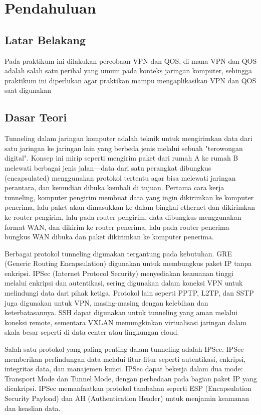 \section{Pendahuluan}
\subsection{Latar Belakang}
Pada praktikum ini dilakukan percobaan VPN dan QOS, di mana VPN dan QOS adalah salah satu 
perihal yang umum pada konteks jaringan komputer, sehingga praktikum ini diperlukan agar praktikan 
mampu mengaplikasikan VPN dan QOS saat digunakan

\subsection{Dasar Teori}
Tunneling dalam jaringan komputer adalah teknik untuk mengirimkan data dari satu jaringan ke jaringan 
lain yang berbeda jenis melalui sebuah "terowongan digital". Konsep ini mirip seperti mengirim paket 
dari rumah A ke rumah B melewati berbagai jenis jalan—data dari satu perangkat dibungkus 
(encapsulated) menggunakan protokol tertentu agar bisa melewati jaringan perantara, dan kemudian 
dibuka kembali di tujuan. Pertama cara kerja tunneling, komputer pengirim membuat data yang ingin 
dikirimkan ke komputer penerima, lalu paket akan dimasukkan ke dalam bingkai ethernet dan dikirimkan 
ke router pengirim, lalu pada router pengirim, data dibungkus menggunakan format WAN, dan dikirim 
ke router penerima, lalu pada router penerima bungkus WAN dibuka dan paket dikirimkan ke komputer penerima.


Berbagai protokol tunneling digunakan tergantung pada kebutuhan. GRE (Generic Routing Encapsulation) 
digunakan untuk membungkus paket IP tanpa enkripsi. IPSec (Internet Protocol Security) menyediakan 
keamanan tinggi melalui enkripsi dan autentikasi, sering digunakan dalam koneksi VPN untuk melindungi 
data dari pihak ketiga. Protokol lain seperti PPTP, L2TP, dan SSTP juga digunakan untuk VPN, 
masing-masing dengan kelebihan dan keterbatasannya. SSH dapat digunakan untuk tunneling yang aman 
melalui koneksi remote, sementara VXLAN memungkinkan virtualisasi jaringan dalam skala besar seperti 
di data center atau lingkungan cloud.

Salah satu protokol yang paling penting dalam tunneling adalah IPSec. IPSec memberikan perlindungan 
data melalui fitur-fitur seperti autentikasi, enkripsi, integritas data, dan manajemen kunci. IPSec 
dapat bekerja dalam dua mode: Transport Mode dan Tunnel Mode, dengan perbedaan pada bagian paket IP 
yang dienkripsi. IPSec memanfaatkan protokol tambahan seperti ESP (Encapsulation Security Payload) 
dan AH (Authentication Header) untuk menjamin keamanan dan keaslian data.

